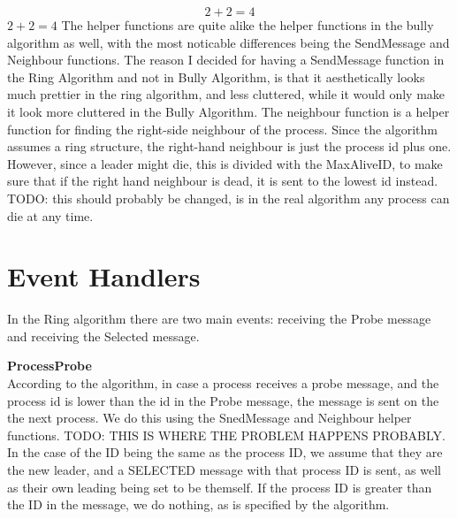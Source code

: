 \documentclass{report}
\begin{document}
\begin{calloutgreen}
\begin{calloutyellow}
$$2+2 = 4$$
$2+2=4$
The helper functions are quite alike the helper functions in the bully algorithm as well, with the most noticable differences being the SendMessage and Neighbour functions.
The reason I decided for having a SendMessage function in the Ring Algorithm and not in Bully Algorithm, is that it aesthetically looks much prettier in the ring algorithm, and less cluttered, while it would only make it look more cluttered in the Bully Algorithm.
The neighbour function is a helper function for finding the right-side neighbour of the process. Since the algorithm assumes a ring structure, the right-hand neighbour is just the process id plus one. However, since a leader might die, this is divided with the MaxAliveID, to make sure that if the right hand neighbour is dead, it is sent to the lowest id instead. TODO: this should probably be changed, is in the real algorithm any process can die at any time.

\section{Event Handlers}
In the Ring algorithm there are two main events: receiving the Probe message and receiving the Selected message.

\noindent{}

\textbf{ProcessProbe}\\
According to the algorithm, in case a process receives a probe message, and the process id is lower than the id in the Probe message, the message is sent on the the next process. We do this using the SnedMessage and Neighbour helper functions. TODO: THIS IS WHERE THE PROBLEM HAPPENS PROBABLY. In the case of the ID being the same as the process ID, we assume that they are the new leader, and a SELECTED message with that process ID is sent, as well as their own leading being set to be themself. If the process ID is greater than the ID in the message, we do nothing, as is specified by the algorithm.


\end{calloutyellow}
\end{calloutgreen}
\end{document}
